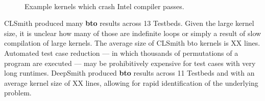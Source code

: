 \begin{figure}
  \centering
  \\%
  \\%
  \\%
  \\%
  \\%
  \\%
  \caption{Example kernels which crash Intel compiler passes.}%
  \label{lst:intel-passes}
\end{figure}

CLSmith produced many \textbf{bto} results across 13 Testbeds. Given the large kernel size, it is unclear how many of those are indefinite loops or simply a result of slow compilation of large kernels. The average size of CLSmith bto kernels is XX lines. Automated test case reduction --- in which thousands of permutations of a program are executed --- may be prohibitively expensive for test cases with very long runtimes. DeepSmith produced \textbf{bto} results across 11 Testbeds and with an average kernel size of XX lines, allowing for rapid identification of the underlying problem.


